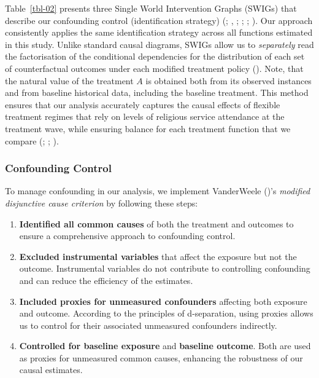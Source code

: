 \documentclass[
  single column]{article}
\providecommand{\tightlist}{%
  \setlength{\itemsep}{0pt}\setlength{\parskip}{0pt}}\usepackage{longtable,booktabs,array}
\begin{document}
Table~\ref{tbl-02} presents three Single World Intervention Graphs
(SWIGs) that describe our confounding control (identification strategy)
(;
,
;
;
;
). Our
approach consistently applies the same identification strategy across
all functions estimated in this study. Unlike standard causal diagrams,
SWIGs allow us to \emph{separately} read the factorisation of the
conditional dependencies for the distribution of each set of
counterfactual outcomes under each modified treatment policy
().
Note, that the natural value of the treatment \(A\) is obtained both
from its observed instances and from baseline historical data, including
the baseline treatment. This method ensures that our analysis accurately
captures the causal effects of flexible treatment regimes that rely on
levels of religious service attendance at the treatment wave, while
ensuring balance for each treatment function that we compare
(;
;
).

\subsubsection{Confounding Control}\label{confounding-control}

To manage confounding in our analysis, we implement VanderWeele
()'s \emph{modified disjunctive
cause criterion} by following these steps:

\begin{enumerate}
\def\labelenumi{\arabic{enumi}.}
\tightlist
\item
  \textbf{Identified all common causes} of both the treatment and
  outcomes to ensure a comprehensive approach to confounding control.
\item
  \textbf{Excluded instrumental variables} that affect the exposure but
  not the outcome. Instrumental variables do not contribute to
  controlling confounding and can reduce the efficiency of the
  estimates.
\item
  \textbf{Included proxies for unmeasured confounders} affecting both
  exposure and outcome. According to the principles of d-separation,
  using proxies allows us to control for their associated unmeasured
  confounders indirectly.
\item
  \textbf{Controlled for baseline exposure} and \textbf{baseline
  outcome}. Both are used as proxies for unmeasured common causes,
  enhancing the robustness of our causal estimates.
\end{enumerate}
\end{document}
